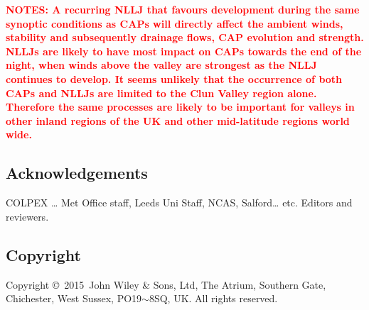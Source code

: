 \documentclass[times]{qjrms4}
\def\volumeyear{2015}
\begin{document}
\textcolor{red}{\bf NOTES:  A recurring NLLJ that favours development during the same synoptic conditions as CAPs will directly affect the ambient winds, stability and subsequently drainage flows, CAP evolution and strength. NLLJs are likely to have most impact on CAPs towards the end of the night, when winds above the valley are strongest as the NLLJ continues to develop. It seems unlikely that the occurrence of both CAPs and NLLJs are limited to the Clun Valley region alone. Therefore the same processes are likely to be important for valleys in other inland regions of the UK and other mid-latitude regions world wide.}



\subsection{Acknowledgements}
COLPEX … Met Office staff, Leeds Uni Staff, NCAS, Salford… etc.  Editors and reviewers.

\subsection{Copyright}
Copyright \copyright\ \volumeyear\ John Wiley \& Sons, Ltd, The Atrium,
Southern Gate, Chichester, West Sussex, PO19$\sim$8SQ, UK.  All rights reserved.
\end{document}
